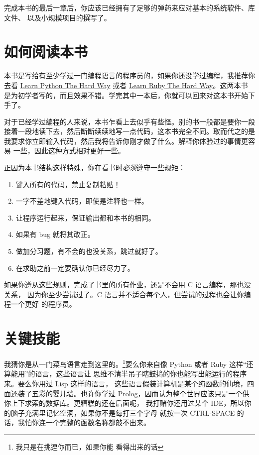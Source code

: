 完成本书的最后一章后，你应该已经拥有了足够的弹药来应对基本的系统软件、库文件、
以及小规模项目的撰写了。


\section*{如何阅读本书}

本书是写给有至少学过一门编程语言的程序员的，如果你还没学过编程，我推荐你去看
\href{http://learnpythonthehardway.org}{Learn Python The Hard Way} 或者
\href{http://ruby.learncodethehardway.org}{Learn Ruby The Hard Way}。这两本书
是为初学者写的，而且效果不错。学完其中一本后，你就可以回来对这本书开始下手了。

对于已经学过编程的人来说，本书乍看上去似乎有些怪。别的书一般都是要你一段
接着一段地读下去，然后断断续续地写一点代码，这本书完全不同。取而代之的是
我要求你立即输入代码，然后我将告诉你刚才做了什么。解释你体验过的事情更容易
一些，因此这种方式相对更好一些。

正因为本书结构这样特殊，你在看书时\emph{必须}遵守一些规矩：

\begin{enumerate}
\item 键入所有的代码，禁止复制粘贴！
\item 一字不差地键入代码，即使是注释也一样。
\item 让程序运行起来，保证输出都和本书的相同。
\item 如果有 bug 就将其改正。
\item 做加分习题，有不会的也没关系，跳过就好了。
\item 在求助之前一定要确认你已经尽力了。
\end{enumerate}

如果你遵从这些规则，完成了书里的所有作业，还是不会用 C 语言编程，那也没关系，
因为你至少尝试过了。C 语言并不适合每个人，但尝试的过程也会让你编程一个更好
的程序员。

\section*{关键技能}

我猜你是从一门菜鸟语言走到这里的。\footnote{我只是在挑逗你而已，如果你能
看得出来的话}要么你来自像 Python 或者 Ruby 这样“还算能用”的语言，这些语言让
思维不清半吊子瞎鼓捣的你也能写出能运行的程序来。要么你用过 Lisp 这样的语言，
这些语言假装计算机是某个纯函数的仙境，四面还装了五彩的婴儿墙。也许你学过
Prolog，因而认为整个世界应该只是一个供你上下求索的数据库。更糟糕的还在后面呢，
我打赌你还用过某个 IDE，所以你的脑子充满里记忆空洞，如果你不是每打三个字母
就按一次 CTRL-SPACE 的话，我怕你连一个完整的函数名称都敲不出来。

